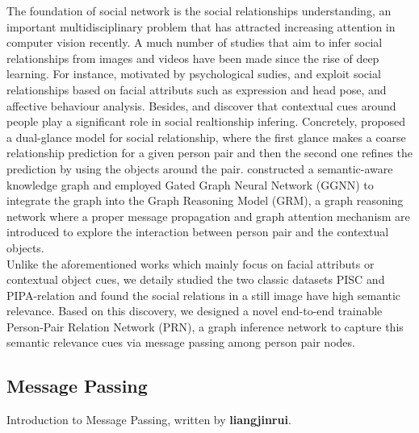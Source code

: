 \documentclass{article}
\begin{document}
The foundation of social network is the social relationships understanding, an important multidisciplinary problem that has attracted increasing attention in computer vision recently. A much number of studies that aim to infer social relationships from images \cite{DBLP:conf/ijcai/WangWG15,DBLP:conf/iccv/LiWZK17,DBLP:conf/ijcai/WangCRYCL18,DBLP:conf/eccv/WangGLF10,DBLP:conf/iccv/ZhangLLT15} and videos \cite{DBLP:conf/eccv/DingY10,DBLP:conf/cvpr/RamanathanY013,DBLP:journals/ivc/VinciarelliPB09} have been made since the rise of deep learning. For instance, motivated by psychological sudies, \cite{DBLP:conf/iccv/ZhangLLT15} and \cite{DBLP:conf/iccv/DibekliogluSG13} exploit social relationships based on facial attributs such as expression and head pose, and affective behaviour analysis. Besides, \cite{DBLP:conf/iccv/LiWZK17} and \cite{DBLP:conf/ijcai/WangCRYCL18} discover that contextual cues around people play a significant role in social realtionship infering. Concretely, \cite{DBLP:conf/iccv/LiWZK17} proposed a dual-glance model for social relationship, where the first glance makes a coarse relationship prediction for a given person pair and then the second one refines the prediction by using the objects around the pair. \cite{DBLP:conf/ijcai/WangCRYCL18} constructed a semantic-aware knowledge graph and employed Gated Graph Neural Network (GGNN) \cite{DBLP:journals/tomccap/LiSKJZW15} to integrate the graph into the Graph Reasoning Model (GRM), a graph reasoning network where a proper message propagation and graph attention mechanism are introduced to explore the interaction between person pair and the contextual objects. \\
Unlike the aforementioned works which mainly focus on facial attributs or contextual object cues, we detaily studied the two classic datasets PISC \cite{DBLP:conf/iccv/LiWZK17} and PIPA-relation \cite{DBLP:conf/cvpr/SunSF17} and found the social relations in a still image have high semantic relevance. Based on this discovery, we designed a novel end-to-end trainable Person-Pair Relation Network (PRN), a graph inference network to capture this semantic relevance cues via message passing among person pair nodes.

\subsection{Message Passing}%


Introduction to Message Passing, written by {\bf liangjinrui}.
 
\end{document}

